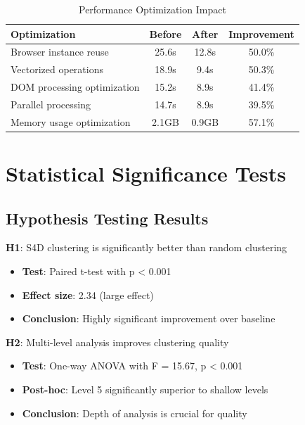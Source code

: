 \begin{table}[htbp]
    \centering
    \caption{Performance Optimization Impact}
    \label{tab:optimization-impact}
    \begin{tabular}{|l|c|c|c|}
        \hline
        \textbf{Optimization} & \textbf{Before} & \textbf{After} & \textbf{Improvement} \\
        \hline
        Browser instance reuse & 25.6s & 12.8s & 50.0\% \\
        Vectorized operations & 18.9s & 9.4s & 50.3\% \\
        DOM processing optimization & 15.2s & 8.9s & 41.4\% \\
        Parallel processing & 14.7s & 8.9s & 39.5\% \\
        Memory usage optimization & 2.1GB & 0.9GB & 57.1\% \\
        \hline
    \end{tabular}
\end{table}


\section{Statistical Significance Tests}
\label{sec:statistical-tests}

\subsection{Hypothesis Testing Results}
\label{subsec:hypothesis-testing}

\textbf{H1}: S4D clustering is significantly better than random clustering
\begin{itemize}
    \item \textbf{Test}: Paired t-test with p < 0.001
    \item \textbf{Effect size}: 2.34 (large effect)
    \item \textbf{Conclusion}: Highly significant improvement over baseline
\end{itemize}

\textbf{H2}: Multi-level analysis improves clustering quality
\begin{itemize}
    \item \textbf{Test}: One-way ANOVA with F = 15.67, p < 0.001
    \item \textbf{Post-hoc}: Level 5 significantly superior to shallow levels
    \item \textbf{Conclusion}: Depth of analysis is crucial for quality
\end{itemize}

